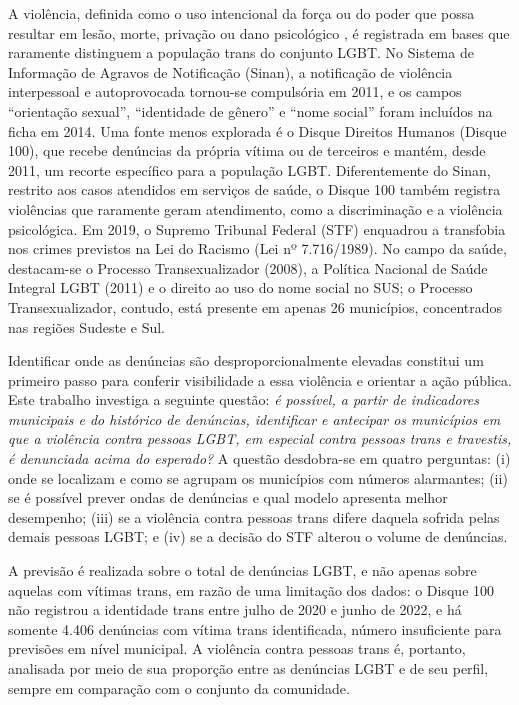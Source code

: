 \documentclass[12pt]{article}
\begin{document}
A violência, definida como o uso intencional da força ou do poder que possa resultar em lesão, morte, privação ou dano psicológico \cite{marinho_tomazelli_firianelli:2024}, é registrada em bases que raramente distinguem a população trans do conjunto LGBT. No Sistema de Informação de Agravos de Notificação (Sinan), a notificação de violência interpessoal e autoprovocada tornou-se compulsória em 2011, e os campos ``orientação sexual'', ``identidade de gênero'' e ``nome social'' foram incluídos na ficha em 2014. Uma fonte menos explorada é o Disque Direitos Humanos (Disque 100), que recebe denúncias da própria vítima ou de terceiros e mantém, desde 2011, um recorte específico para a população LGBT. Diferentemente do Sinan, restrito aos casos atendidos em serviços de saúde, o Disque 100 também registra violências que raramente geram atendimento, como a discriminação e a violência psicológica. Em 2019, o Supremo Tribunal Federal (STF) enquadrou a transfobia nos crimes previstos na Lei do Racismo (Lei nº 7.716/1989). No campo da saúde, destacam-se o Processo Transexualizador (2008), a Política Nacional de Saúde Integral LGBT (2011) e o direito ao uso do nome social no SUS; o Processo Transexualizador, contudo, está presente em apenas 26 municípios, concentrados nas regiões Sudeste e Sul.

Identificar onde as denúncias são desproporcionalmente elevadas constitui um primeiro passo para conferir visibilidade a essa violência e orientar a ação pública. Este trabalho investiga a seguinte questão: \textit{é possível, a partir de indicadores municipais e do histórico de denúncias, identificar e antecipar os municípios em que a violência contra pessoas LGBT, em especial contra pessoas trans e travestis, é denunciada acima do esperado?} A questão desdobra-se em quatro perguntas: (i) onde se localizam e como se agrupam os municípios com números alarmantes; (ii) se é possível prever ondas de denúncias e qual modelo apresenta melhor desempenho; (iii) se a violência contra pessoas trans difere daquela sofrida pelas demais pessoas LGBT; e (iv) se a decisão do STF alterou o volume de denúncias.

A previsão é realizada sobre o total de denúncias LGBT, e não apenas sobre aquelas com vítimas trans, em razão de uma limitação dos dados: o Disque 100 não registrou a identidade trans entre julho de 2020 e junho de 2022, e há somente 4.406 denúncias com vítima trans identificada, número insuficiente para previsões em nível municipal. A violência contra pessoas trans é, portanto, analisada por meio de sua proporção entre as denúncias LGBT e de seu perfil, sempre em comparação com o conjunto da comunidade.
\end{document}
